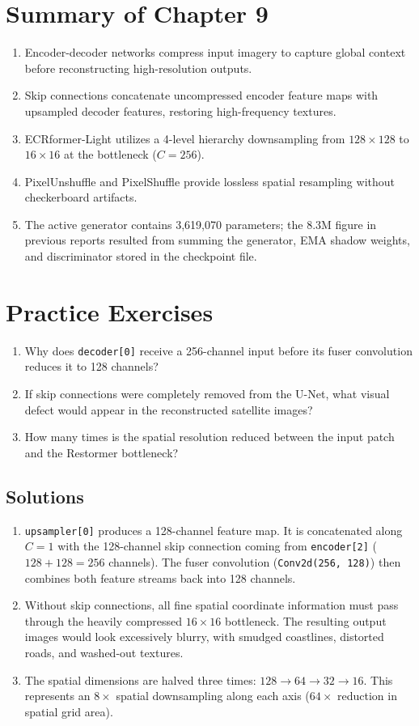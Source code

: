 \section{Summary of Chapter 9}
\begin{enumerate}
    \item Encoder-decoder networks compress input imagery to capture global context before reconstructing high-resolution outputs.
    \item Skip connections concatenate uncompressed encoder feature maps with upsampled decoder features, restoring high-frequency textures.
    \item ECRformer-Light utilizes a 4-level hierarchy downsampling from $128\times 128$ to $16\times 16$ at the bottleneck ($C=256$).
    \item PixelUnshuffle and PixelShuffle provide lossless spatial resampling without checkerboard artifacts.
    \item The active generator contains 3,619,070 parameters; the 8.3M figure in previous reports resulted from summing the generator, EMA shadow weights, and discriminator stored in the checkpoint file.
\end{enumerate}

\section{Practice Exercises}
\begin{enumerate}
    \item Why does \texttt{decoder[0]} receive a 256-channel input before its fuser convolution reduces it to 128 channels?
    \item If skip connections were completely removed from the U-Net, what visual defect would appear in the reconstructed satellite images?
    \item How many times is the spatial resolution reduced between the input patch and the Restormer bottleneck?
\end{enumerate}

\subsection*{Solutions}
\begin{enumerate}
    \item \texttt{upsampler[0]} produces a 128-channel feature map. It is concatenated along $C=1$ with the 128-channel skip connection coming from \texttt{encoder[2]} ($128 + 128 = 256$ channels). The fuser convolution (\texttt{Conv2d(256, 128)}) then combines both feature streams back into 128 channels.
    \item Without skip connections, all fine spatial coordinate information must pass through the heavily compressed $16\times 16$ bottleneck. The resulting output images would look excessively blurry, with smudged coastlines, distorted roads, and washed-out textures.
    \item The spatial dimensions are halved three times: $128 \to 64 \to 32 \to 16$. This represents an $8\times$ spatial downsampling along each axis ($64\times$ reduction in spatial grid area).
\end{enumerate}
